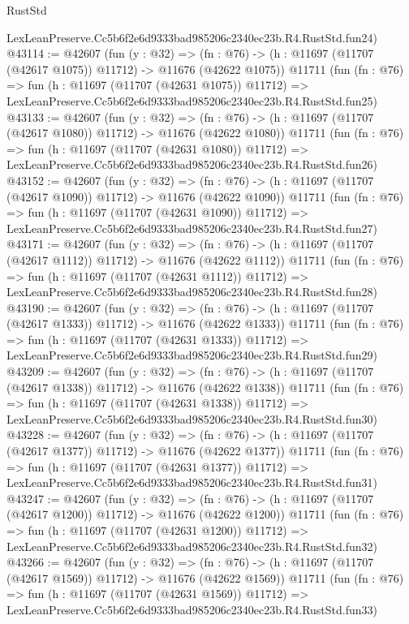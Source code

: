 \begin{lexlean}{RustStd}
\begin{coremodule}
    LexLeanPreserve.Cc5b6f2e6d9333bad985206c2340ec23b.R4.RustStd.fun24)
@43114 := @42607
    (fun (y : @32) =>
    (fn : @76) -> (h : @11697 (@11707 (@42617 @1075)) @11712) -> @11676 (@42622 @1075))
    @11711
    (fun (fn : @76) =>
    fun (h : @11697 (@11707 (@42631 @1075)) @11712) =>
    LexLeanPreserve.Cc5b6f2e6d9333bad985206c2340ec23b.R4.RustStd.fun25)
@43133 := @42607
    (fun (y : @32) =>
    (fn : @76) -> (h : @11697 (@11707 (@42617 @1080)) @11712) -> @11676 (@42622 @1080))
    @11711
    (fun (fn : @76) =>
    fun (h : @11697 (@11707 (@42631 @1080)) @11712) =>
    LexLeanPreserve.Cc5b6f2e6d9333bad985206c2340ec23b.R4.RustStd.fun26)
@43152 := @42607
    (fun (y : @32) =>
    (fn : @76) -> (h : @11697 (@11707 (@42617 @1090)) @11712) -> @11676 (@42622 @1090))
    @11711
    (fun (fn : @76) =>
    fun (h : @11697 (@11707 (@42631 @1090)) @11712) =>
    LexLeanPreserve.Cc5b6f2e6d9333bad985206c2340ec23b.R4.RustStd.fun27)
@43171 := @42607
    (fun (y : @32) =>
    (fn : @76) -> (h : @11697 (@11707 (@42617 @1112)) @11712) -> @11676 (@42622 @1112))
    @11711
    (fun (fn : @76) =>
    fun (h : @11697 (@11707 (@42631 @1112)) @11712) =>
    LexLeanPreserve.Cc5b6f2e6d9333bad985206c2340ec23b.R4.RustStd.fun28)
@43190 := @42607
    (fun (y : @32) =>
    (fn : @76) -> (h : @11697 (@11707 (@42617 @1333)) @11712) -> @11676 (@42622 @1333))
    @11711
    (fun (fn : @76) =>
    fun (h : @11697 (@11707 (@42631 @1333)) @11712) =>
    LexLeanPreserve.Cc5b6f2e6d9333bad985206c2340ec23b.R4.RustStd.fun29)
@43209 := @42607
    (fun (y : @32) =>
    (fn : @76) -> (h : @11697 (@11707 (@42617 @1338)) @11712) -> @11676 (@42622 @1338))
    @11711
    (fun (fn : @76) =>
    fun (h : @11697 (@11707 (@42631 @1338)) @11712) =>
    LexLeanPreserve.Cc5b6f2e6d9333bad985206c2340ec23b.R4.RustStd.fun30)
@43228 := @42607
    (fun (y : @32) =>
    (fn : @76) -> (h : @11697 (@11707 (@42617 @1377)) @11712) -> @11676 (@42622 @1377))
    @11711
    (fun (fn : @76) =>
    fun (h : @11697 (@11707 (@42631 @1377)) @11712) =>
    LexLeanPreserve.Cc5b6f2e6d9333bad985206c2340ec23b.R4.RustStd.fun31)
@43247 := @42607
    (fun (y : @32) =>
    (fn : @76) -> (h : @11697 (@11707 (@42617 @1200)) @11712) -> @11676 (@42622 @1200))
    @11711
    (fun (fn : @76) =>
    fun (h : @11697 (@11707 (@42631 @1200)) @11712) =>
    LexLeanPreserve.Cc5b6f2e6d9333bad985206c2340ec23b.R4.RustStd.fun32)
@43266 := @42607
    (fun (y : @32) =>
    (fn : @76) -> (h : @11697 (@11707 (@42617 @1569)) @11712) -> @11676 (@42622 @1569))
    @11711
    (fun (fn : @76) =>
    fun (h : @11697 (@11707 (@42631 @1569)) @11712) =>
    LexLeanPreserve.Cc5b6f2e6d9333bad985206c2340ec23b.R4.RustStd.fun33)

\end{coremodule}
\end{lexlean}
